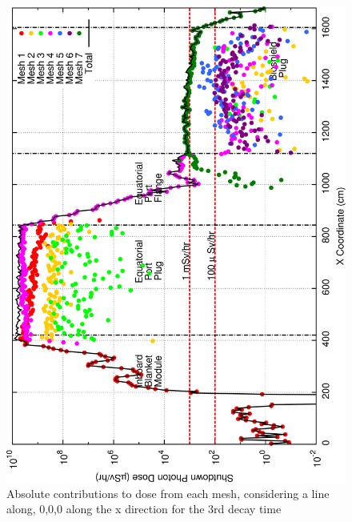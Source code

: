 \documentclass[12pt]{article}
\begin{document}
\begin{figure}[ht!]
\centering
\includegraphics[clip,scale=0.25]{../plots/crosstalk/b4c/ep/dc3.png}
\caption{Absolute contributions to dose from each mesh, considering a line along, 0,0,0 along the x direction for the 3rd decay time}
\label{fig:b4c_ct_ep_dc3}
\end{figure}
\end{document}
